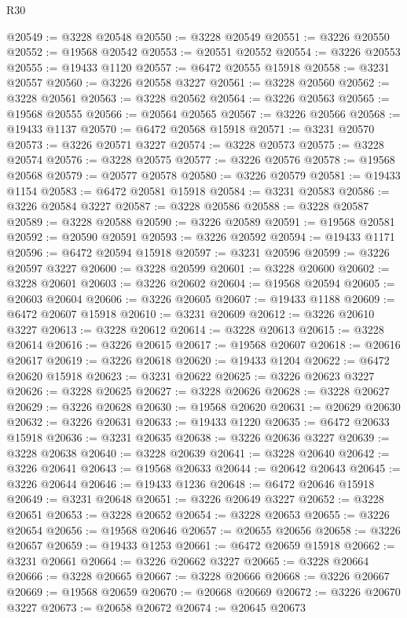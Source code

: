 \begin{lexlean}{R30}
\begin{coremodule}
@20549 := @3228 @20548
@20550 := @3228 @20549
@20551 := @3226 @20550
@20552 := @19568 @20542
@20553 := @20551 @20552
@20554 := @3226 @20553
@20555 := @19433 @1120
@20557 := @6472 @20555 @15918
@20558 := @3231 @20557
@20560 := @3226 @20558 @3227
@20561 := @3228 @20560
@20562 := @3228 @20561
@20563 := @3228 @20562
@20564 := @3226 @20563
@20565 := @19568 @20555
@20566 := @20564 @20565
@20567 := @3226 @20566
@20568 := @19433 @1137
@20570 := @6472 @20568 @15918
@20571 := @3231 @20570
@20573 := @3226 @20571 @3227
@20574 := @3228 @20573
@20575 := @3228 @20574
@20576 := @3228 @20575
@20577 := @3226 @20576
@20578 := @19568 @20568
@20579 := @20577 @20578
@20580 := @3226 @20579
@20581 := @19433 @1154
@20583 := @6472 @20581 @15918
@20584 := @3231 @20583
@20586 := @3226 @20584 @3227
@20587 := @3228 @20586
@20588 := @3228 @20587
@20589 := @3228 @20588
@20590 := @3226 @20589
@20591 := @19568 @20581
@20592 := @20590 @20591
@20593 := @3226 @20592
@20594 := @19433 @1171
@20596 := @6472 @20594 @15918
@20597 := @3231 @20596
@20599 := @3226 @20597 @3227
@20600 := @3228 @20599
@20601 := @3228 @20600
@20602 := @3228 @20601
@20603 := @3226 @20602
@20604 := @19568 @20594
@20605 := @20603 @20604
@20606 := @3226 @20605
@20607 := @19433 @1188
@20609 := @6472 @20607 @15918
@20610 := @3231 @20609
@20612 := @3226 @20610 @3227
@20613 := @3228 @20612
@20614 := @3228 @20613
@20615 := @3228 @20614
@20616 := @3226 @20615
@20617 := @19568 @20607
@20618 := @20616 @20617
@20619 := @3226 @20618
@20620 := @19433 @1204
@20622 := @6472 @20620 @15918
@20623 := @3231 @20622
@20625 := @3226 @20623 @3227
@20626 := @3228 @20625
@20627 := @3228 @20626
@20628 := @3228 @20627
@20629 := @3226 @20628
@20630 := @19568 @20620
@20631 := @20629 @20630
@20632 := @3226 @20631
@20633 := @19433 @1220
@20635 := @6472 @20633 @15918
@20636 := @3231 @20635
@20638 := @3226 @20636 @3227
@20639 := @3228 @20638
@20640 := @3228 @20639
@20641 := @3228 @20640
@20642 := @3226 @20641
@20643 := @19568 @20633
@20644 := @20642 @20643
@20645 := @3226 @20644
@20646 := @19433 @1236
@20648 := @6472 @20646 @15918
@20649 := @3231 @20648
@20651 := @3226 @20649 @3227
@20652 := @3228 @20651
@20653 := @3228 @20652
@20654 := @3228 @20653
@20655 := @3226 @20654
@20656 := @19568 @20646
@20657 := @20655 @20656
@20658 := @3226 @20657
@20659 := @19433 @1253
@20661 := @6472 @20659 @15918
@20662 := @3231 @20661
@20664 := @3226 @20662 @3227
@20665 := @3228 @20664
@20666 := @3228 @20665
@20667 := @3228 @20666
@20668 := @3226 @20667
@20669 := @19568 @20659
@20670 := @20668 @20669
@20672 := @3226 @20670 @3227
@20673 := @20658 @20672
@20674 := @20645 @20673

\end{coremodule}
\end{lexlean}
